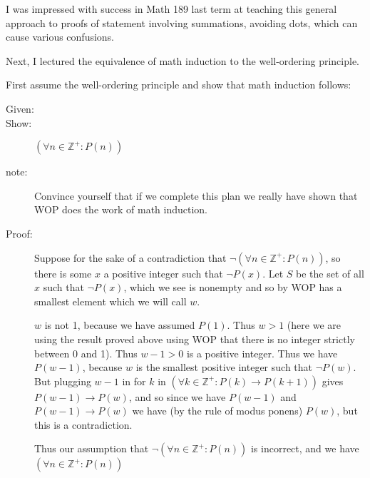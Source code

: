 \documentclass[12pt]{article}
\begin{document}
I was impressed with success in Math 189 last term at teaching this general approach to proofs of statement involving summations, avoiding dots, which can cause various confusions.

Next, I lectured the equivalence of math induction to the well-ordering principle.

First assume the well-ordering principle and show that math induction follows:

\begin{description}

\item[Given:]


\item[Show:]  $(\forall n \in {\mathbb Z}^+:P(n))$

\item[note:]  Convince yourself that if we complete this plan we really have shown that WOP does the work of math induction.

\item[Proof:]  Suppose for the sake of a contradiction that $\neg (\forall n \in {\mathbb Z}^+:P(n))$, so there is some
$x$ a positive integer such that $\neg P(x)$.  Let $S$ be the set of all $x$ such that $\neg P(x)$, which we see is nonempty and so by WOP has a smallest element which we will call $w$.

$w$ is not 1, because we have assumed $P(1)$.  Thus $w>1$ (here we are using the result proved above using WOP that there is no integer strictly between 0 and 1).  Thus $w-1>0$ is a positive integer.  Thus we have $P(w-1)$, because $w$ is the smallest positive integer such that $\neg P(w)$.
But plugging $w-1$ in for $k$ in $(\forall k \in {\mathbb Z}^+:P(k) \rightarrow P(k+1))$ gives $P(w-1) \rightarrow P(w)$, and so since we have
$P(w-1)$ and $P(w-1) \rightarrow P(w)$ we have (by the rule of modus ponens) $P(w)$, but this is a contradiction.

Thus our assumption that $\neg (\forall n \in {\mathbb Z}^+:P(n))$ is incorrect, and we have $(\forall n \in {\mathbb Z}^+:P(n))$


\end{description}
\end{document}
